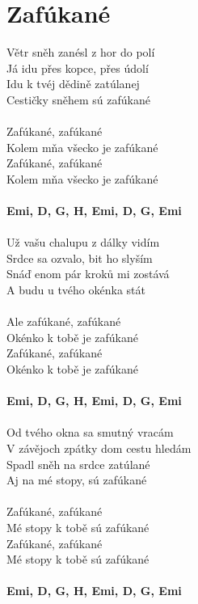 \section{Zafúkané}
Větr sněh zanésl z hor do polí\\
Já idu přes kopce, přes údolí\\
Idu k tvéj dědině zatúlanej\\
Cestičky sněhem sú zafúkané\\
\\
Zafúkané, zafúkané\\
Kolem mňa všecko je zafúkané\\
Zafúkané, zafúkané\\
Kolem mňa všecko je zafúkané\\
\\
\footnotesize\textbf{Emi, D, G, H\7, Emi, D, G, Emi}\\
\\
\normalsize
{}Už vašu chalupu z dálky vidím\\
Srdce sa ozvalo, bit ho slyším\\
Snáď enom pár kroků mi zostává\\
A budu u tvého okénka stát\\
\\
Ale zafúkané, zafúkané\\
Okénko k tobě je zafúkané\\
Zafúkané, zafúkané\\
Okénko k tobě je zafúkané\\
\\
\footnotesize\textbf{Emi, D, G, H\7, Emi, D, G, Emi}\\
\\
\normalsize
{}Od tvého okna sa smutný vracám\\
V závějoch zpátky dom cestu hledám\\
Spadl sněh na srdce zatúlané\\
Aj na mé stopy, sú zafúkané\\
\\
Zafúkané, zafúkané\\
Mé stopy k tobě sú zafúkané\\
Zafúkané, zafúkané\\
Mé stopy k tobě sú zafúkané\\
\\
\footnotesize\textbf{Emi, D, G, H\7, Emi, D, G, Emi}\\
\normalsize